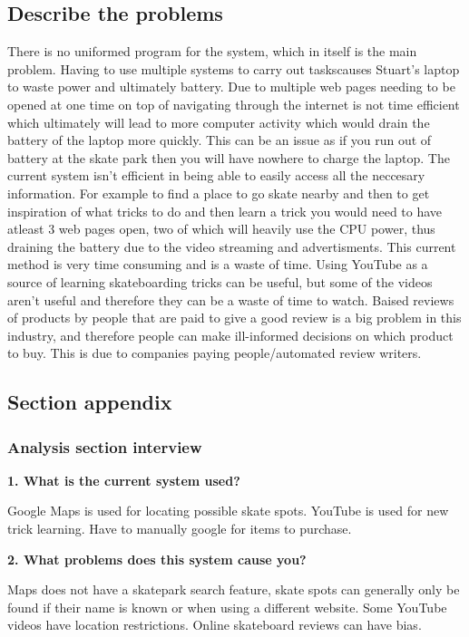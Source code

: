 \subsection{Describe the problems}

There is no uniformed program for the system, which in itself is the main problem. Having to use multiple systems to carry out taskscauses Stuart's laptop to waste power and ultimately battery. Due to multiple web pages needing to be opened at one time on top of navigating through the internet is not time efficient which ultimately will lead to more computer activity which would drain the battery of the laptop more quickly. This can be an issue as if you run out of battery at the skate park then you will have nowhere to charge the laptop. The current system  isn't efficient in being able to easily access all the neccesary information. For example to find a place to go skate nearby and then to get inspiration of what tricks to do and then learn a trick you would need to have atleast 3 web pages open, two of which will heavily use the CPU power, thus draining the battery due to the video streaming and advertisments. This current method is very time consuming and is a waste of time. Using YouTube as a source of learning skateboarding tricks can be useful, but some of the videos aren't useful and therefore they can be a waste of time to watch. Baised reviews of products by people that are paid to give a good review is a big problem in this industry, and therefore people can make ill-informed decisions on which product to buy. This is due to companies paying people/automated review writers. 

\subsection{Section appendix}

\subsubsection{Analysis section interview}

\textbf{1. What is the current system used?}

Google Maps is used for locating possible skate spots.
YouTube is used for new trick learning.
Have to manually google for items to purchase.

\textbf{2. What problems does this system cause you?}

Maps does not have a skatepark search feature, skate spots can generally only be found if their name is known or when using a different website.
Some YouTube videos have location restrictions.
Online skateboard reviews can have bias.

